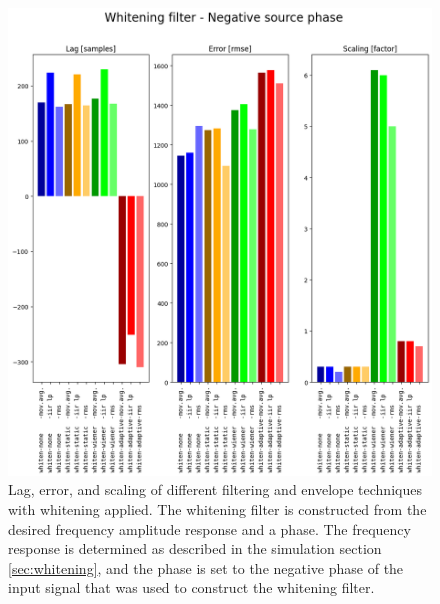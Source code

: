\begin{figure}[h!t]
	\begin{center}
		\includegraphics[width=1.0\columnwidth]{images/result_whitening_negative_sourcephase.png}
	\end{center}
	\caption{Lag, error, and scaling of different filtering and envelope techniques with whitening applied. The whitening filter is constructed from the desired frequency amplitude response and a phase. The frequency response is determined as described in the simulation section \ref{sec:whitening}, and the phase is set to the negative phase of the input signal that was used to construct the whitening filter.}
	\label{fig:result_whitening_negative_sourcephase}
\end{figure}

